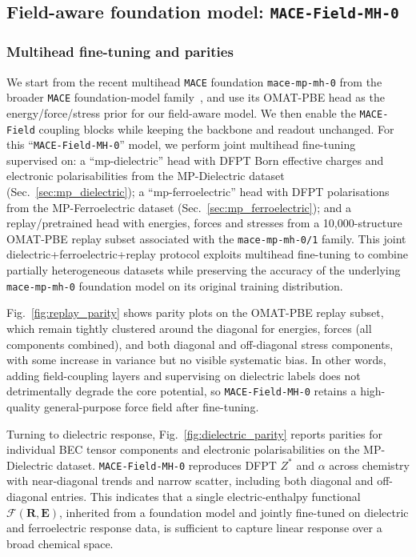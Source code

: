 \documentclass[aps,physrev,graphicx,amsmath,amssymb,
               reprint,superscriptaddress]{revtex4-2}
\begin{document}
\subsection{Field-aware foundation model: \texttt{MACE-Field-MH-0}}
\label{subsec:fine-tuning_foundation}

\subsubsection{Multihead fine-tuning and parities}

We start from the recent multihead \texttt{MACE} foundation \texttt{mace-mp-mh-0} from the broader \texttt{MACE} foundation-model family~\cite{batatia2025foundationmodelatomisticmaterials}, and use its OMAT-PBE head as the energy/force/stress prior for our field-aware model. We then enable the \texttt{MACE-Field} coupling blocks while keeping the backbone and readout unchanged. For this ``\texttt{MACE-Field-MH-0}'' model, we perform joint multihead fine-tuning supervised on: a ``mp-dielectric'' head with DFPT Born effective charges and electronic polarisabilities from the MP-Dielectric dataset (Sec.~\ref{sec:mp_dielectric}); a ``mp-ferroelectric'' head with DFPT polarisations from the MP-Ferroelectric dataset (Sec.~\ref{sec:mp_ferroelectric}); and a replay/pretrained head with energies, forces and stresses from a 10{,}000-structure OMAT-PBE replay subset associated with the \texttt{mace-mp-mh-0/1} family. This joint dielectric+ferroelectric+replay protocol exploits multihead fine-tuning to combine partially heterogeneous datasets while preserving the accuracy of the underlying \texttt{mace-mp-mh-0} foundation model on its original training distribution.

Fig.~\ref{fig:replay_parity} shows parity plots on the OMAT-PBE replay subset, which remain tightly clustered around the diagonal for energies, forces (all components combined), and both diagonal and off-diagonal stress components, with some increase in variance but no visible systematic bias. In other words, adding field-coupling layers and supervising on dielectric labels does not detrimentally degrade the core potential, so \texttt{MACE-Field-MH-0} retains a high-quality general-purpose force field after fine-tuning.

Turning to dielectric response, Fig.~\ref{fig:dielectric_parity} reports parities for individual BEC tensor components and electronic polarisabilities on the MP-Dielectric dataset. \texttt{MACE-Field-MH-0} reproduces DFPT $Z^*$ and $\alpha$ across chemistry with near-diagonal trends and narrow scatter, including both diagonal and off-diagonal entries. This indicates that a single electric-enthalpy functional $\mathcal{F}(\mathbf{R},\mathbf{E})$, inherited from a foundation model and jointly fine-tuned on dielectric and ferroelectric response data, is sufficient to capture linear response over a broad chemical space.
\end{document}
